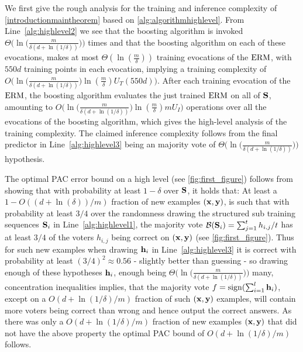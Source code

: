 We first give the rough analysis for the training and inference complexity of \cref{introductionmaintheorem} based on \cref{alg:algorithmhighlevel}. From Line~\ref{alg:highlevel2} we see that the boosting algorithm is invoked $ \Theta\big(\ln\big(\tfrac{m}{\delta\left(d+\ln{\left(1/\delta \right)}\right)}\big)\big)$ times and that the boosting algorithm on each of these evocations, makes at most $ \Theta\left(\ln{\left(\tfrac{m}{\delta} \right)} \right)$ training evocations of the $ \mathrm{ERM} $, with $ 550d $ training points in each evocation, implying a training complexity of $ O\big(\ln\big(\frac{m}{\delta\left(d+\ln{\left(1/\delta \right)}\right)}\big)  \ln{\left(\tfrac{m}{\delta} \right)}   U_{T}(550d)\big)$. After each training evocation of the $ \mathrm{ERM}$, the boosting algorithm evaluates the just trained $ \mathrm{ERM} $ on all of $ \mathbf{S} $, amounting to $ O\big(\ln\big(\frac{m}{\delta\left(d+\ln{\left(1/\delta \right)}\right)}\big)  \ln{\left(\tfrac{m}{\delta} \right)}   mU_{I}\big)$ operations over all the evocations of the boosting algorithm, which gives the high-level analysis of the training complexity. The claimed inference complexity follows from the final predictor in Line~\ref{alg:highlevel3} being an majority vote of  $ \Theta\big(\ln\big(\tfrac{m}{\delta\left(d+\ln{\left(1/\delta \right)}\right)}\big)\big) $ hypothesis. 


The optimal PAC error bound on a high level (see \cref{fig:first_figure}) follows from showing that with probability at least $ 1-\delta $ over $ \mathbf{S} $, it holds that: At least a $ 1-O\left(\left(d+\ln{\left(\delta\right)}\right)/m \right)$ fraction of new examples $ (\mathbf{x},\mathbf{y}) $, is such that with probability at least $ 3/4 $ over the randomness drawing the structured sub training sequences $ \mathbf{S}_{i} $ in Line~\ref{alg:highlevel1}, the majority vote $ \mathcal{B}(\mathbf{S}_{i})=\sum_{j=1}^{t}h_{i,j}/t $ has at least $ 3/4 $ of the voters $ h_{i,j} $ being correct on $ (\mathbf{x},\mathbf{y}) $ (see \cref{fig:first_figure}). Thus for such new examples when drawing $ \mathbf{h}_{i} $ in Line~\ref{alg:highlevel3} it is correct with probability at least $ (3/4)^{2}\approx 0.56 $ - slightly better than guessing - so drawing enough of these hypotheses $ \mathbf{h}_{i} $, enough being $\Theta\big(\ln\big(\tfrac{m}{\delta\left(d+\ln{\left(1/\delta \right)}\right)}\big)\big) $ many, concentration inequalities implies, that the majority vote $f=\operatorname{sign}(\sum_{i=1}^{l} \mathbf{h}_i) $, except on a $ O\left(d+\ln{\left(1/\delta \right)}/m\right) $ fraction of such $ (\mathbf{x},\mathbf{y}) $ examples, will contain more voters being correct than wrong and hence output the correct answers. As there was only a $ O\left(d+\ln{\left(1/\delta \right)}/m\right) $ fraction of new examples $ (\mathbf{x},\mathbf{y}) $  that did not have the above property the optimal PAC bound of $ O\left(d+\ln{\left(1/\delta \right)}/m\right) $ follows.



